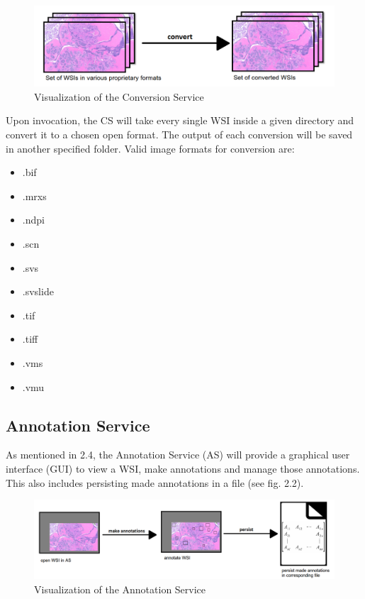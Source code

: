 \begin{figure}[H]
	\begin{center}
		\includegraphics[scale=0.35]{img/processChainA.png}
		\caption{Visualization of the Conversion Service}
		\label{fig:fig2.1}
	\end{center}
\end{figure}

Upon invocation, the CS will take every single WSI inside a given directory and convert it to a chosen open format. The output of each conversion will be saved in another specified folder. Valid image formats for conversion are:

\begin{itemize}
	\item .bif
	\item .mrxs
	\item .ndpi
	\item .scn
	\item .svs
	\item .svslide
	\item .tif
	\item .tiff
	\item .vms
	\item .vmu
\end{itemize}


\subsection{Annotation Service}
As mentioned in 2.4, the Annotation Service (AS) will provide a graphical user interface (GUI) to view a WSI, make annotations and manage those annotations. This also includes persisting made annotations in a file (see fig. 2.2).

\begin{figure}[H]
	\begin{center}
		\includegraphics[scale=0.2]{img/processChainB.png}
		\caption{Visualization of the Annotation Service}
		\label{fig:fig2.4}
	\end{center}
\end{figure}

